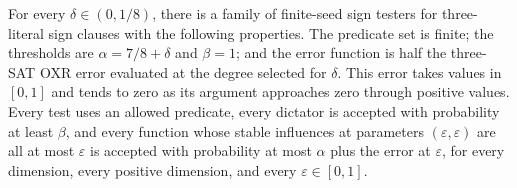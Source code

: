 \begin{theorem}
\label{FABL.hastadThreeSat_dictatorVsNoNotables}
\leanok
{}
For every $\delta\in(0,1/8)$, there is a family of finite-seed sign testers for
three-literal sign clauses with the following properties. The predicate set is finite;
the thresholds are $\alpha=7/8+\delta$ and $\beta=1$; and the error function is half the
three-SAT OXR error evaluated at the degree selected for $\delta$. This error takes
values in $[0,1]$ and tends to zero as its argument approaches zero through positive
values. Every test uses an allowed predicate, every dictator is accepted with
probability at least $\beta$, and every function whose stable influences at parameters
$(\varepsilon,\varepsilon)$ are all at most $\varepsilon$ is accepted with probability
at most $\alpha$ plus the error at $\varepsilon$, for every dimension, every positive
dimension, and every $\varepsilon\in[0,1]$.
\end{theorem}
